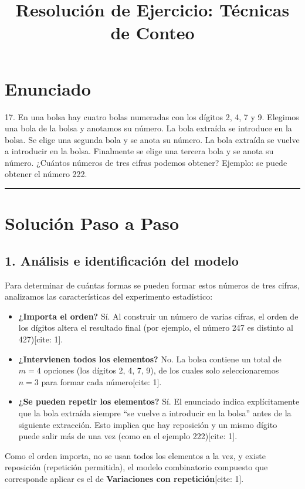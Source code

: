 \documentclass[12pt, a4paper]{article}
\title{Resolución de Ejercicio: Técnicas de Conteo}
\author{}
\date{}
\begin{document}
\maketitle

\section*{Enunciado}
17. En una bolsa hay cuatro bolas numeradas con los dígitos 2, 4, 7 y 9. Elegimos una bola de la bolsa y anotamos su número. La bola extraída se introduce en la bolsa. Se elige una segunda bola y se anota su número. La bola extraída se vuelve a introducir en la bolsa. Finalmente se elige una tercera bola y se anota su número. ¿Cuántos números de tres cifras podemos obtener? Ejemplo: se puede obtener el número 222.

\vspace{0.5cm}
\hrule
\vspace{0.5cm}

\section*{Solución Paso a Paso}

\subsection*{1. Análisis e identificación del modelo}
Para determinar de cuántas formas se pueden formar estos números de tres cifras, analizamos las características del experimento estadístico:
\begin{itemize}[label=\checkmark]
    \item \textbf{¿Importa el orden?} Sí. Al construir un número de varias cifras, el orden de los dígitos altera el resultado final (por ejemplo, el número 247 es distinto al 427)[cite: 1].
    \item \textbf{¿Intervienen todos los elementos?} No. La bolsa contiene un total de $m=4$ opciones (los dígitos 2, 4, 7, 9), de los cuales solo seleccionaremos $n=3$ para formar cada número[cite: 1].
    \item \textbf{¿Se pueden repetir los elementos?} Sí. El enunciado indica explícitamente que la bola extraída siempre ``se vuelve a introducir en la bolsa'' antes de la siguiente extracción. Esto implica que hay reposición y un mismo dígito puede salir más de una vez (como en el ejemplo 222)[cite: 1].
\end{itemize}

Como el orden importa, no se usan todos los elementos a la vez, y existe reposición (repetición permitida), el modelo combinatorio compuesto que corresponde aplicar es el de \textbf{Variaciones con repetición}[cite: 1].
\end{document}
